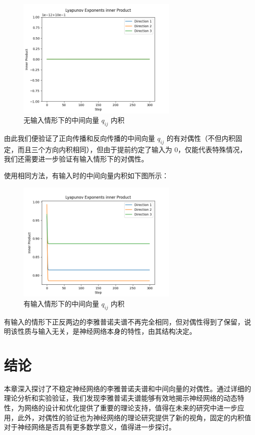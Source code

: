 \begin{figure}[htbp]
  \centering
  \includegraphics[width=0.7\textwidth]{figures/lyapunov_exponents_inner_product.png}
  \caption{无输入情形下的中间向量 $q_{ij}$ 内积}
  \label{fig:inner_product}
\end{figure}

由此我们便验证了正向传播和反向传播的中间向量 $q_{ij}$ 的有对偶性（不但内积固定，而且三个方向内积相同），但由于提前约定了输入为 0，仅能代表特殊情况，我们还需要进一步验证有输入情形下的对偶性。

使用相同方法，有输入时的中间向量内积如下图所示：

\begin{figure}[htbp]
  \centering
  \includegraphics[width=0.7\textwidth]{figures/lyapunov_exponents_inner_product_with_input.png}
  \caption{有输入情形下的中间向量 $q_{ij}$ 内积}
  \label{fig:inner_product_with_input}
\end{figure}

有输入的情形下正反两边的李雅普诺夫谱不再完全相同，但对偶性得到了保留，说明该性质与输入无关，是神经网络本身的特性，由其结构决定。

\section{结论}

本章深入探讨了不稳定神经网络的李雅普诺夫谱和中间向量的对偶性。通过详细的理论分析和实验验证，我们发现李雅普诺夫谱能够有效地揭示神经网络的动态特性，为网络的设计和优化提供了重要的理论支持，值得在未来的研究中进一步应用，此外，对偶性的验证也为神经网络的理论研究提供了新的视角，固定的内积值对于神经网络是否具有更多数学意义，值得进一步探讨。